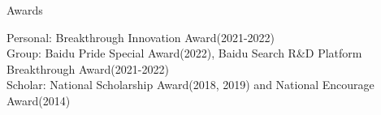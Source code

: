 \documentclass[
	11pt, %
]{resume} %
\begin{document}

\begin{rSection}{Awards}
        \item Personal: Breakthrough Innovation Award(2021-2022) \\
	Group: Baidu Pride Special Award(2022), Baidu Search R\&D Platform Breakthrough Award(2021-2022) \\
        Scholar: National Scholarship Award(2018, 2019) and National Encourage Award(2014) \\
        
\end{rSection}

\end{document}

